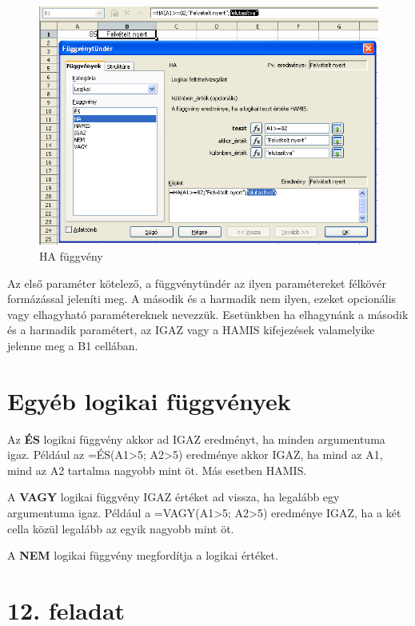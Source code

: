 \begin{figure}[!h]
\begin{center}
\includegraphics[width=13.199cm]{oocalcv2-img66.png}
\caption{HA függvény}\label{ifFüggvény}
\end{center}
\end{figure}

Az első paraméter kötelező, a függvénytündér az
ilyen paramétereket félkövér formázással jeleníti meg. A
második és a harmadik nem ilyen, ezeket opcionális vagy
elhagyható paramétereknek nevezzük. Esetünkben ha elhagynánk
a második és a harmadik paramétert, az IGAZ vagy a HAMIS
kifejezések valamelyike jelenne meg a B1 cellában.


\section{Egyéb logikai függvények}

Az \textbf{ÉS} logikai függvény akkor ad IGAZ eredményt, ha
minden argumentuma igaz. Például az =ÉS(A1>5;
A2>5) eredménye akkor IGAZ, ha mind az A1, mind az A2
tartalma nagyobb mint öt. Más esetben HAMIS.

A \textbf{VAGY} logikai függvény IGAZ értéket ad vissza, ha
legalább egy argumentuma igaz. Például a =VAGY(A1>5;
A2>5) eredménye IGAZ, ha a két cella közül
legalább az egyik nagyobb mint öt. 

A \textbf{NEM} logikai függvény megfordítja a logikai értéket.


\section{12. feladat}


